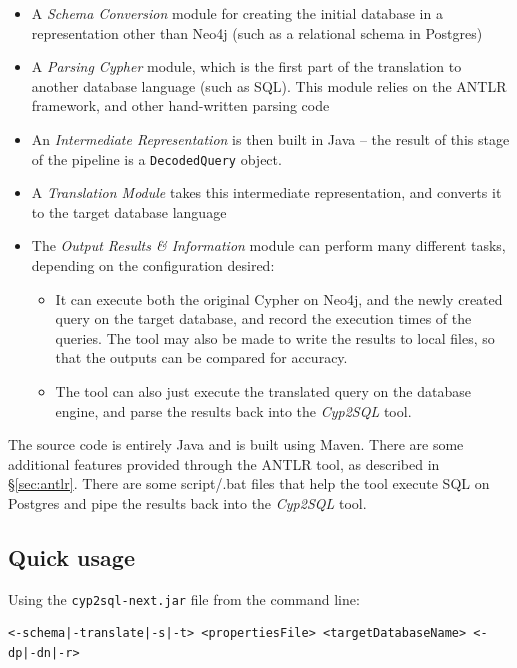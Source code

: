 \documentclass[letterpaper]{ltxdoc}
\begin{document}
\begin{itemize}
\item A \emph{Schema Conversion} module for creating the initial database in a representation other than Neo4j (such as a relational schema in Postgres)
\item A \emph{Parsing Cypher} module, which is the first part of the translation to another database language (such as SQL). This module relies on the ANTLR framework, and other hand-written parsing code
\item An \emph{Intermediate Representation} is then built in Java -- the result of this stage of the pipeline is a \texttt{DecodedQuery} object.
\item A \emph{Translation Module} takes this intermediate representation, and converts it to the target database language
\item The \emph{Output Results \& Information} module can perform many different tasks, depending on the configuration desired:
\begin{itemize}
\item It can execute both the original Cypher on Neo4j, and the newly created query on the target database, and record the execution times of the queries. The tool may also be made to write the results to local files, so that the outputs can be compared for accuracy.
\item The tool can also just execute the translated query on the database engine, and parse the results back into the \emph{Cyp2SQL} tool.
\end{itemize}
\end{itemize}

\medskip

The source code is entirely Java and is built using Maven. There are some additional features provided through the ANTLR tool, as described in \S \ref{sec:antlr}. There are some script/.bat files that help the tool execute SQL on Postgres and pipe the results back into the \emph{Cyp2SQL} tool.

\subsection{Quick usage}
Using the \texttt{cyp2sql-next.jar} file from the command line:
\begin{verbatim}
<-schema|-translate|-s|-t> <propertiesFile> <targetDatabaseName> <-dp|-dn|-r>
\end{verbatim}
\end{document}
